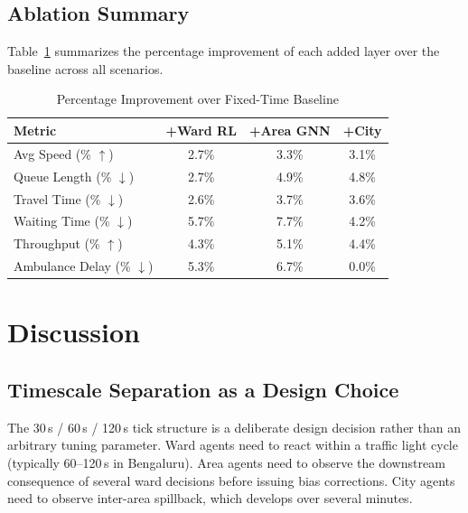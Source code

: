 \documentclass[conference]{IEEEtran}
\begin{document}
\subsection{Ablation Summary}

Table~\ref{tab:ablation_summary} summarizes the percentage improvement
of each added layer over the baseline across all scenarios.

\begin{table}[!t]
\caption{Percentage Improvement over Fixed-Time Baseline}
\label{tab:ablation_summary}
\centering
\renewcommand{\arraystretch}{1.2}
\begin{tabular}{lccc}
\toprule
\textbf{Metric} & \textbf{+Ward RL} & \textbf{+Area GNN} & \textbf{+City} \\
\midrule
Avg Speed (\% $\uparrow$)         & 2.7\% & 3.3\% & 3.1\% \\
Queue Length (\% $\downarrow$)    & 2.7\% & 4.9\% & 4.8\% \\
Travel Time (\% $\downarrow$)     & 2.6\% & 3.7\% & 3.6\% \\
Waiting Time (\% $\downarrow$)    & 5.7\% & 7.7\% & 4.2\% \\
Throughput (\% $\uparrow$)        & 4.3\% & 5.1\% & 4.4\% \\
Ambulance Delay (\% $\downarrow$) & 5.3\% & 6.7\% & 0.0\% \\
\bottomrule
\end{tabular}
\end{table}

\section{Discussion}

\subsection{Timescale Separation as a Design Choice}

The 30\,s / 60\,s / 120\,s tick structure is a deliberate design decision
rather than an arbitrary tuning parameter. Ward agents need to react within
a traffic light cycle (typically 60--120\,s in Bengaluru). Area agents need
to observe the downstream consequence of several ward decisions before
issuing bias corrections. City agents need to observe inter-area spillback,
which develops over several minutes.
\end{document}
